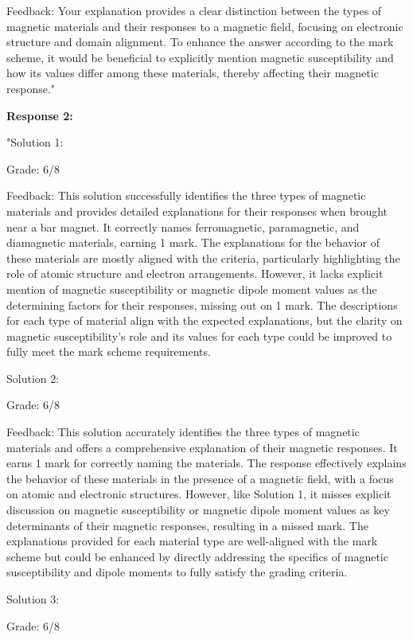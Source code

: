 \documentclass[a4paper,11pt]{article}
\begin{document}
Feedback: Your explanation provides a clear distinction between the types of magnetic materials and their responses to a magnetic field, focusing on electronic structure and domain alignment. To enhance the answer according to the mark scheme, it would be beneficial to explicitly mention magnetic susceptibility and how its values differ among these materials, thereby affecting their magnetic response."

\textbf{Response 2:}

"Solution 1:

Grade: 6/8

Feedback: This solution successfully identifies the three types of magnetic materials and provides detailed explanations for their responses when brought near a bar magnet. It correctly names ferromagnetic, paramagnetic, and diamagnetic materials, earning 1 mark. The explanations for the behavior of these materials are mostly aligned with the criteria, particularly highlighting the role of atomic structure and electron arrangements. However, it lacks explicit mention of magnetic susceptibility or magnetic dipole moment values as the determining factors for their responses, missing out on 1 mark. The descriptions for each type of material align with the expected explanations, but the clarity on magnetic susceptibility's role and its values for each type could be improved to fully meet the mark scheme requirements.

Solution 2:

Grade: 6/8

Feedback: This solution accurately identifies the three types of magnetic materials and offers a comprehensive explanation of their magnetic responses. It earns 1 mark for correctly naming the materials. The response effectively explains the behavior of these materials in the presence of a magnetic field, with a focus on atomic and electronic structures. However, like Solution 1, it misses explicit discussion on magnetic susceptibility or magnetic dipole moment values as key determinants of their magnetic responses, resulting in a missed mark. The explanations provided for each material type are well-aligned with the mark scheme but could be enhanced by directly addressing the specifics of magnetic susceptibility and dipole moments to fully satisfy the grading criteria.

Solution 3:

Grade: 6/8
\end{document}
